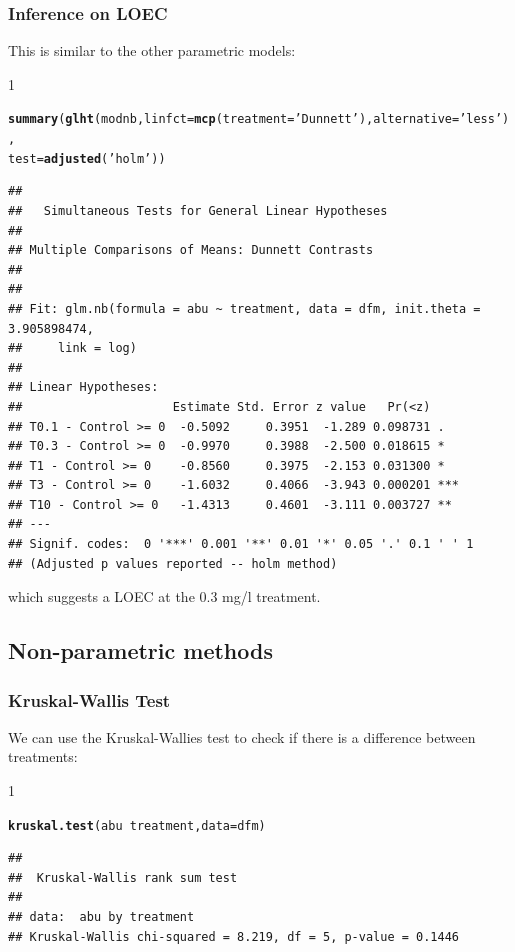 \documentclass{scrartcl}\usepackage[]{graphicx}\usepackage[]{color}
\makeatletter
\newcommand{\hlstr}[1]{\textcolor[rgb]{0.192,0.494,0.8}{#1}}%
\newcommand{\hlopt}[1]{\textcolor[rgb]{0,0,0}{#1}}%
\newcommand{\hlstd}[1]{\textcolor[rgb]{0.345,0.345,0.345}{#1}}%
\newcommand{\hlkwc}[1]{\textcolor[rgb]{0.333,0.667,0.333}{#1}}%
\newcommand{\hlkwd}[1]{\textcolor[rgb]{0.737,0.353,0.396}{\textbf{#1}}}%
\newenvironment{kframe}{%
 \def\at@end@of@kframe{}%
 \ifinner\ifhmode%
  \def\at@end@of@kframe{\end{minipage}}%
  \begin{minipage}{\columnwidth}%
 \fi\fi%
 \def\FrameCommand##1{\hskip\@totalleftmargin \hskip-\fboxsep
 \colorbox{shadecolor}{##1}\hskip-\fboxsep
     \hskip-\linewidth \hskip-\@totalleftmargin \hskip\columnwidth}%
 \MakeFramed {\advance\hsize-\width
   \@totalleftmargin\z@ \linewidth\hsize
   \@setminipage}}%
 {\par\unskip\endMakeFramed%
 \at@end@of@kframe}
\newenvironment{knitrout}{}{} %
\renewenvironment{knitrout}{\begin{spacing}{1}}{\end{spacing}}
\makeatother
\begin{document}
\subsubsection{Inference on LOEC}
This is similar to the other parametric models:
\begin{knitrout}
\color{fgcolor}\begin{kframe}
\begin{alltt}
\hlkwd{summary}\hlstd{(}\hlkwd{glht}\hlstd{(modnb,} \hlkwc{linfct} \hlstd{=} \hlkwd{mcp}\hlstd{(}\hlkwc{treatment} \hlstd{=} \hlstr{'Dunnett'}\hlstd{),}  \hlkwc{alternative} \hlstd{=} \hlstr{'less'}\hlstd{),}
        \hlkwc{test} \hlstd{=} \hlkwd{adjusted}\hlstd{(}\hlstr{'holm'}\hlstd{))}
\end{alltt}
\begin{verbatim}
## 
## 	 Simultaneous Tests for General Linear Hypotheses
## 
## Multiple Comparisons of Means: Dunnett Contrasts
## 
## 
## Fit: glm.nb(formula = abu ~ treatment, data = dfm, init.theta = 3.905898474, 
##     link = log)
## 
## Linear Hypotheses:
##                     Estimate Std. Error z value   Pr(<z)    
## T0.1 - Control >= 0  -0.5092     0.3951  -1.289 0.098731 .  
## T0.3 - Control >= 0  -0.9970     0.3988  -2.500 0.018615 *  
## T1 - Control >= 0    -0.8560     0.3975  -2.153 0.031300 *  
## T3 - Control >= 0    -1.6032     0.4066  -3.943 0.000201 ***
## T10 - Control >= 0   -1.4313     0.4601  -3.111 0.003727 ** 
## ---
## Signif. codes:  0 '***' 0.001 '**' 0.01 '*' 0.05 '.' 0.1 ' ' 1
## (Adjusted p values reported -- holm method)
\end{verbatim}
\end{kframe}
\end{knitrout}
which suggests a LOEC at the 0.3 mg/l treatment.


\subsection{Non-parametric methods}
\subsubsection{Kruskal-Wallis Test}
We can use the Kruskal-Wallies test to check if there is a difference between treatments:

\begin{knitrout}
\color{fgcolor}\begin{kframe}
\begin{alltt}
\hlkwd{kruskal.test}\hlstd{(abu} \hlopt{~} \hlstd{treatment,} \hlkwc{data} \hlstd{= dfm)}
\end{alltt}
\begin{verbatim}
## 
## 	Kruskal-Wallis rank sum test
## 
## data:  abu by treatment
## Kruskal-Wallis chi-squared = 8.219, df = 5, p-value = 0.1446
\end{verbatim}
\end{kframe}
\end{knitrout}
\end{document}

